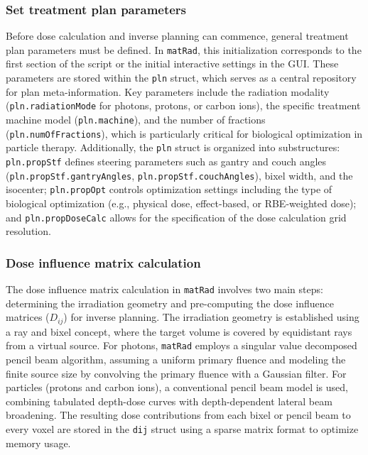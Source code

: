\subsubsection{Set treatment plan parameters}
Before dose calculation and inverse planning can commence, general treatment plan parameters must be defined. In \texttt{matRad}, this initialization corresponds to the first section of the script or the initial interactive settings in the GUI. These parameters are stored within the \texttt{pln} struct, which serves as a central repository for plan meta-information. Key parameters include the radiation modality (\texttt{pln.radiationMode} for photons, protons, or carbon ions), the specific treatment machine model (\texttt{pln.machine}), and the number of fractions (\texttt{pln.numOfFractions}), which is particularly critical for biological optimization in particle therapy. Additionally, the \texttt{pln} struct is organized into substructures: \texttt{pln.propStf} defines steering parameters such as gantry and couch angles (\texttt{pln.propStf.gantryAngles}, \texttt{pln.propStf.couchAngles}), bixel width, and the isocenter; \texttt{pln.propOpt} controls optimization settings including the type of biological optimization (e.g., physical dose, effect-based, or RBE-weighted dose); and \texttt{pln.propDoseCalc} allows for the specification of the dose calculation grid resolution.

\subsubsection{Dose influence matrix calculation}
The dose influence matrix calculation in \texttt{matRad} involves two main steps: determining the irradiation geometry and pre-computing the dose influence matrices ($D_{ij}$) for inverse planning. The irradiation geometry is established using a ray and bixel concept, where the target volume is covered by equidistant rays from a virtual source. For photons, \texttt{matRad} employs a singular value decomposed pencil beam algorithm, assuming a uniform primary fluence and modeling the finite source size by convolving the primary fluence with a Gaussian filter. For particles (protons and carbon ions), a conventional pencil beam model is used, combining tabulated depth-dose curves with depth-dependent lateral beam broadening. The resulting dose contributions from each bixel or pencil beam to every voxel are stored in the \texttt{dij} struct using a sparse matrix format to optimize memory usage.

